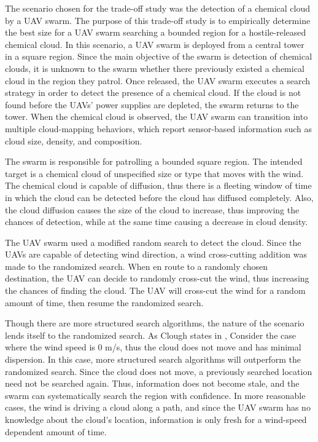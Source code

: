The scenario chosen for the trade-off study was the detection of a chemical cloud by a UAV swarm. The purpose of this trade-off study is to empirically determine the best size for a UAV swarm searching a bounded region for a hostile-released chemical cloud. In this scenario, a UAV swarm is deployed from a central tower in a square region. Since the main objective of the swarm is detection of chemical clouds, it is unknown to the swarm whether there previously existed a chemical cloud in the region they patrol. Once released, the UAV swarm executes a search strategy in order to detect the presence of a chemical cloud. If the cloud is not found before the UAVs' power supplies are depleted, the swarm returns to the tower. When the chemical cloud is observed, the UAV swarm can transition into multiple cloud-mapping behaviors, which report sensor-based information such as cloud size, density, and composition. 

The swarm is responsible for patrolling a bounded square region. The intended target is a chemical cloud of unspecified size or type that moves with the wind. The chemical cloud is capable of diffusion, thus there is a fleeting window of time in which the cloud can be detected before the cloud has diffused completely. Also, the cloud diffusion causes the size of the cloud to increase, thus improving the chances of detection, while at the same time causing a decrease in cloud density. 

The UAV swarm used a modified random search to detect the cloud. Since the UAVs are capable of detecting wind direction, a wind cross-cutting addition was made to the randomized search. When en route to a randomly chosen destination, the UAV can decide to randomly cross-cut the wind, thus increasing the chances of finding the cloud. The UAV will cross-cut the wind for a random amount of time, then resume the randomized search.

Though there are more structured search algorithms, the nature of the scenario lends itself to the randomized search. As Clough states in \cite{clough:SwarmingUAVs},  Consider the case where the wind speed is 0 m/s, thus the cloud does not move and has minimal dispersion. In this case, more structured search algorithms will outperform the randomized search. Since the cloud does not move, a previously searched location need not be searched again. Thus, information does not become stale, and the swarm can systematically search the region with confidence. In more reasonable cases, the wind is driving a cloud along a path, and since the UAV swarm has no \apriori{} knowledge about the cloud's location, information is only fresh for a wind-speed dependent amount of time.  

